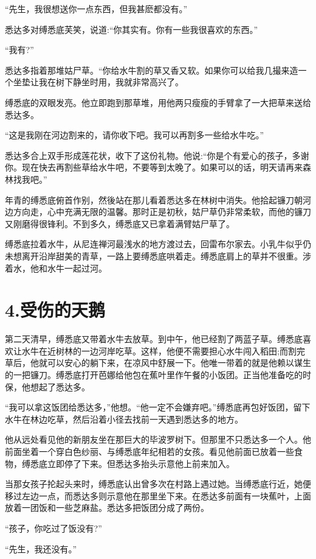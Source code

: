 \documentclass[12pt,twoside,openany]{book}
\begin{document}
“先生，我很想送你一点东西，但我甚麽都没有。”

悉达多对缚悉底芙笑，说道:“你其实有。你有一些我很喜欢的东西。”

“我有?”

悉达多指着那堆姑尸草。“你给水牛割的草又香又软。如果你可以给我几撮来造一个坐垫让我在树下静坐时用，我就非常高兴了。

缚悉底的双眼发亮。他立即跑到那草堆，用他两只瘦瘦的手臂拿了一大把草来送给悉达多。

“这是我刚在河边割来的，请你收下吧。我可以再割多一些给水牛吃。”

悉达多合上双手形成莲花状，收下了这份礼物。他说:“你是个有爱心的孩子，多谢你。现在快去再割些草给水牛吧，不要等到太晚了。如果可以的话，明天请再来森林找我吧。”

年青的缚悉底俯首作别，然後站在那儿看着悉达多在林树中消失。他拾起镰刀朝河边方向走，心中充满无限的温馨。那时正是初秋，姑尸草仍非常柔软，而他的镰刀又刚磨得很锋利。不到多久，缚悉底又已拿着满臂姑尸草了。

缚悉底拉着水牛，从尼连禅河最浅水的地方渡过去，回雷布尔家去。小乳牛似乎仍未想离开沿岸甜美的青草，一路上要缚悉底哄着走。缚悉底肩上的草并不很重。涉着水，他和水牛一起过河。

\chapter{4.受伤的天鹅}\label{ch4}

第二天清早，缚悉底又带着水牛去放草。到中午，他已经割了两蓝子草。缚悉底喜欢让水牛在近树林的一边河岸吃草。这样，他便不需要担心水牛闯入稻田;而割完草后，他就可以安心的躺下来，在凉风中舒展一下。他唯一带着的就是他赖以谋生的一把镰刀。缚悉底打开芭娜给他包在蕉叶里作午餐的小饭团。正当他准备吃的时保，他想起了悉达多。

“我可以拿这饭团给悉达多，”他想。“他一定不会嫌弃吧。”缚悉底再包好饭团，留下水牛在林边吃草，然后沿着小径去找前一天遇到悉达多的地方。

他从远处看见他的新朋友坐在那巨大的毕波罗树下。但那里不只悉达多一个人。他前面坐着一个穿白色纱丽、与缚悉底年纪相若的女孩。看见他前面已放着一些食物，缚悉底立即停了下来。但悉达多抬头示意他上前来加入。

当那女孩子抡起头来时，缚悉底认出曾多次在村路上遇过她。当缚悉底行近，她便移过左边一点，而悉达多则示意他在那里坐下来。在悉达多前面有一块蕉叶，上面放着一团饭和一些芝麻盐。悉达多把饭团分成了两份。

“孩子，你吃过了饭没有?”

“先生，我还没有。”
\end{document}
